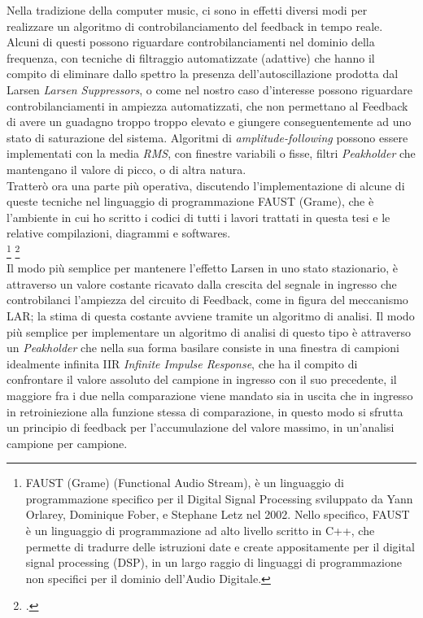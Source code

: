 Nella tradizione della computer music, ci sono in effetti
diversi modi per realizzare un algoritmo di controbilanciamento 
del feedback in tempo reale.
Alcuni di questi possono riguardare controbilanciamenti nel dominio della frequenza,
con tecniche di filtraggio automatizzate (adattive) che
hanno il compito di eliminare dallo spettro la presenza dell'autoscillazione prodotta dal Larsen \textit{Larsen Suppressors},
o come nel nostro caso d’interesse possono riguardare controbilanciamenti in ampiezza
automatizzati, che non permettano al Feedback di avere un guadagno troppo troppo elevato 
e giungere conseguentemente ad uno stato di saturazione del sistema.
Algoritmi di \textit{amplitude-following} possono essere implementati 
con la media \textit{RMS}, con finestre variabili o fisse, 
filtri \textit{Peakholder} che mantengano il valore di picco, o di altra natura. \\
Tratterò ora  una parte più operativa, discutendo l'implementazione
di alcune di queste tecniche nel linguaggio di programmazione FAUST (Grame), 
che è l'ambiente in cui ho scritto i codici di tutti i lavori trattati
in questa tesi e le relative compilazioni, diagrammi e softwares. \\
\footnote{FAUST (Grame) (Functional Audio Stream), 
è un linguaggio di programmazione specifico per il Digital Signal
Processing sviluppato da Yann Orlarey, Dominique Fober, e Stephane Letz nel
2002. Nello specifico, FAUST è un linguaggio di programmazione ad alto livello
scritto in C++, che permette di tradurre delle istruzioni date e create 
appositamente per il digital signal processing (DSP), in un largo raggio di linguaggi
di programmazione non specifici per il dominio dell’Audio Digitale.} \footcite{https://faust.grame.fr/} \\
Il modo più semplice per mantenere l’effetto Larsen in uno stato stazionario, è attraverso un
valore costante ricavato dalla crescita del segnale in ingresso 
che controbilanci l’ampiezza del circuito di Feedback, come in figura del meccanismo LAR;
la stima di questa costante avviene tramite un algoritmo di analisi.
Il modo più semplice per implementare un algoritmo di analisi di questo tipo
è attraverso un \textit{Peakholder} che nella sua forma basilare consiste in una finestra 
di campioni idealmente infinita IIR \textit{Infinite Impulse Response},
che ha il compito di confrontare il valore assoluto del campione in ingresso con il suo precedente,
il maggiore fra i due nella comparazione viene mandato sia in uscita che in ingresso 
in retroiniezione alla funzione stessa di comparazione, 
in questo modo si sfrutta un principio di feedback per l'accumulazione
del valore massimo, in un'analisi campione per campione.

